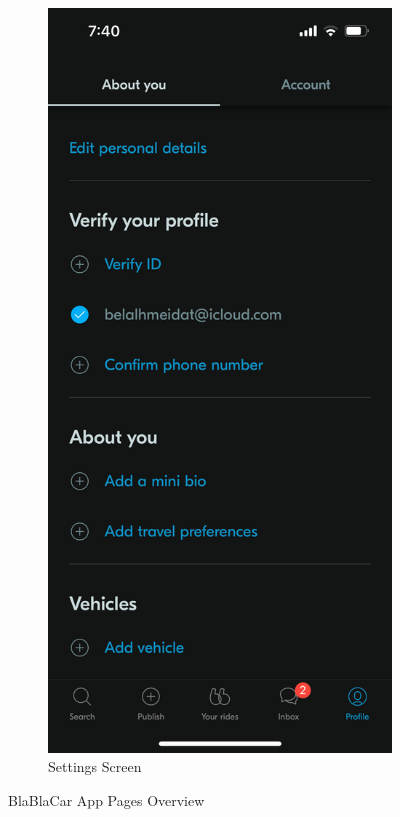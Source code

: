 \documentclass[a4paper, 12pt]{report} %
\begin{document}
\begin{figure}
\begin{subfigure}{0.3\textwidth}
                        \includegraphics[width=0.8\linewidth, height=0.9\textheight, keepaspectratio]{Images/Blablacar_settings.PNG}
                        \caption{Settings Screen}
                        \label{fig:blabla_settings}
                    \end{subfigure}
                    \caption{BlaBlaCar App Pages Overview \cite{blablacar_app}}
                    \label{fig:blabla_gallary}
                \end{figure}
                \pagebreak
\end{document}
